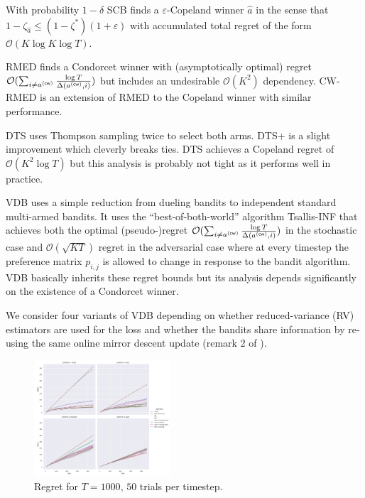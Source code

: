 \documentclass[10pt,twocolumn,letterpaper]{article}
\begin{document}
With probability \( 1 - \delta \) SCB finds a \( \varepsilon \)-Copeland
winner \( \hat{a} \) in the sense that \( 1 - \zeta_{\hat{a}} \leq (1 -
\zeta^*)(1 + \varepsilon) \) with accumulated total regret of the form \(
\mathcal{O}(K \log K \log T) \).

RMED finds a Condorcet winner with (asymptotically optimal) regret \(
\mathcal{O}(\sum_{i \neq a^{(\operatorname{\mathsf{cw}})}} \frac{\log T}{\Delta(a^{(\operatorname{\mathsf{cw}})},
i)}) \) but includes an undesirable \( \mathcal{O}(K^2) \) dependency.
CW-RMED is an extension of RMED to the
Copeland winner with similar performance.

DTS uses Thompson sampling twice to select both arms.
DTS+ is a slight improvement which cleverly breaks ties.
DTS achieves a Copeland regret of \( \mathcal{O}(K^2 \log T) \) but
this analysis is probably not tight as it performs well in practice.

VDB uses a simple reduction from dueling bandits
to independent standard multi-armed bandits.
It uses the ``best-of-both-world'' algorithm Tsallis-INF
\cite{zimmert2022tsallisinf} that achieves both the optimal (pseudo-)regret
\(
\mathcal{O}(\sum_{i \neq a^{(\operatorname{\mathsf{cw}})}} \frac{\log T}{\Delta(a^{(\operatorname{\mathsf{cw}})}, i)})
\) in the stochastic case and \( \mathcal{O}(\sqrt{KT}) \) regret in the
adversarial case where at every timestep the preference matrix \( p_{i,
j} \) is allowed to change in response to the bandit algorithm.
VDB basically inherits these regret bounds but its analysis
depends significantly on the existence of a Condorcet winner.

We consider four variants of VDB depending on whether reduced-variance (RV)
estimators are used for the loss \cite{zimmert2022tsallisinf} and whether the
bandits share information by re-using the same online mirror descent update
(remark 2 of \cite{saha2022versatile}).

\begin{figure}
  \centering
  \includegraphics[width=0.45\textwidth]{figures/regret_1.png}
  \caption{%
    Regret for \( T = 1000 \), \( 50 \) trials per timestep.
  }
  \label{fig:regret1}
\end{figure}
\end{document}
